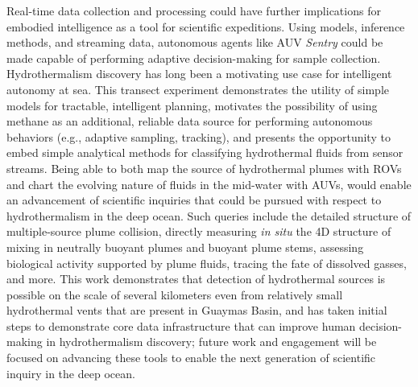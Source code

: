 Real-time data collection and processing could have further implications for embodied intelligence as a tool for scientific expeditions. Using models, inference methods, and streaming data, autonomous agents like AUV \emph{Sentry} could be made capable of performing adaptive decision-making for sample collection. Hydrothermalism discovery has long been a motivating use case for intelligent autonomy at sea\autocite{yoerger2007autonomous, jakuba2007stochastic, branch2020demonstration, wang20203}. This transect experiment demonstrates the utility of simple models for tractable, intelligent planning, motivates the possibility of using methane as an additional, reliable data source for performing autonomous behaviors (e.g., adaptive sampling, tracking), and presents the opportunity to embed simple analytical methods for classifying hydrothermal fluids from sensor streams. Being able to both map the source of hydrothermal plumes with ROVs and chart the evolving nature of fluids in the mid-water with AUVs, would enable an advancement of scientific inquiries that could be pursued with respect to hydrothermalism in the deep ocean. Such queries include the detailed structure of multiple-source plume collision, directly measuring \emph{in situ} the 4D structure of mixing in neutrally buoyant plumes and buoyant plume stems, assessing biological activity supported by plume fluids, tracing the fate of dissolved gasses, and more. This work demonstrates that detection of hydrothermal sources is possible on the scale of several kilometers even from relatively small hydrothermal vents that are present in Guaymas Basin, and has taken initial steps to demonstrate core data infrastructure that can improve human decision-making in hydrothermalism discovery; future work and engagement will be focused on advancing these tools to enable the next generation of scientific inquiry in the deep ocean.
